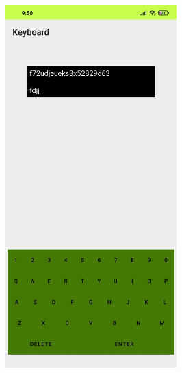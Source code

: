 \documentclass[12pt,letterpaper]{article}
\begin{document}
\begin{figure}
    \centering
    \includegraphics[height=14cm, keepaspectratio]{Keyboard/Outputs/OP3.png}
\end{figure}
\end{document}
